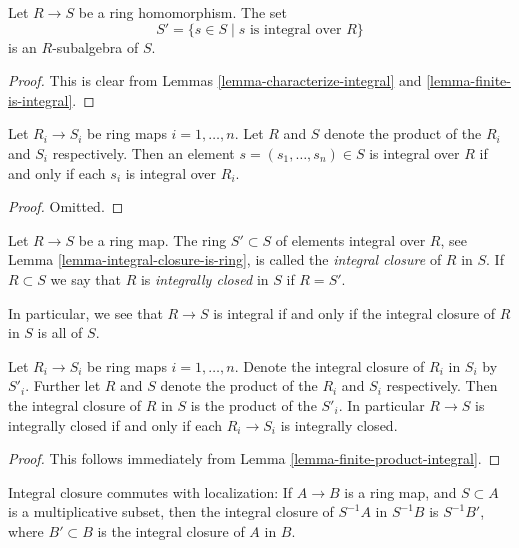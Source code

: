 \begin{lemma}
\label{lemma-integral-closure-is-ring}
Let $R \to S$ be a ring homomorphism.
The set
$$
S' = \{s \in S \mid s\text{ is integral over }R\}
$$
is an $R$-subalgebra of $S$.
\end{lemma}

\begin{proof}
This is clear from Lemmas \ref{lemma-characterize-integral}
and \ref{lemma-finite-is-integral}.
\end{proof}

\begin{lemma}
\label{lemma-finite-product-integral}
Let $R_i\to S_i$ be ring maps $i = 1, \ldots, n$.
Let $R$ and $S$ denote the product of the $R_i$ and $S_i$ respectively.
Then an element $s = (s_1, \ldots, s_n) \in S$ is integral over $R$
if and only if each $s_i$ is integral over $R_i$.
\end{lemma}

\begin{proof}
Omitted.
\end{proof}

\begin{definition}
\label{definition-integral-closure}
Let $R \to S$ be a ring map.
The ring $S' \subset S$ of elements integral over
$R$, see Lemma \ref{lemma-integral-closure-is-ring},
is called the {\it integral closure} of $R$
in $S$. If $R \subset S$ we say that $R$ is
{\it integrally closed} in $S$ if $R = S'$.
\end{definition}

\noindent
In particular, we see that $R \to S$ is integral if and only
if the integral closure of $R$ in $S$ is all of $S$.

\begin{lemma}
\label{lemma-finite-product-integral-closure}
Let $R_i\to S_i$ be ring maps $i = 1, \ldots, n$.
Denote the integral closure of $R_i$ in $S_i$ by $S'_i$.
Further let $R$ and $S$ denote the product of the $R_i$ and $S_i$ respectively.
Then the integral closure of $R$ in $S$
is the product of the $S'_i$. In particular $R \to S$ is
integrally closed if and only if each $R_i \to S_i$ is integrally closed.
\end{lemma}

\begin{proof}
This follows immediately from Lemma \ref{lemma-finite-product-integral}.
\end{proof}

\begin{lemma}
\label{lemma-integral-closure-localize}
Integral closure commutes with localization: If $A \to B$ is a ring
map, and $S \subset A$ is a multiplicative subset, then the integral
closure of $S^{-1}A$ in $S^{-1}B$ is $S^{-1}B'$, where $B' \subset B$
is the integral closure of $A$ in $B$.
\end{lemma}

